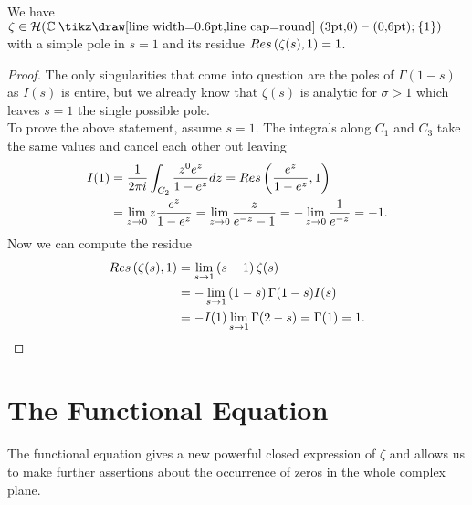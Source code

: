 \begin{theorem}
	We have $\zeta \in \mathcal{H}(\field{C} \mysetminus \fbr{1})$ with a simple pole in $s = 1$ and its residue $Res\left(\zeta(s), 1\right) = 1$.
\end{theorem}
\begin{proof}
	The only singularities that come into question are the poles of $\Gamma(1 - s)$ as $I(s)$ is entire, but we already know that $\zeta(s)$ is analytic for $\sigma > 1$ which leaves $s = 1$ the single possible pole. \\
	To prove the above statement, assume $s = 1$. The integrals along $C_1$ and $C_3$ take the same values and cancel each other out leaving
\begin{equation*}
\begin{aligned}
	I(1) 
	&= \frac{1}{2 \pi i} \int _{C_2} \frac{z^{0} e^z}{1 - e^z} dz = Res\left(\frac{e^z}{1 - e^z}, 1\right) \\
	&= \lim\limits _{z \to 0} z \frac{e^z}{1 - e^z} = \lim\limits _{z \to 0} \frac{z}{e^{-z} - 1} = -\lim\limits _{z \to 0} \frac{1}{e^{-z}} = -1.
\end{aligned}
\end{equation*}
	Now we can compute the residue
\begin{equation*}
\begin{aligned}	
	Res\left(\zeta(s), 1\right) 
	&= \lim\limits _{s \to 1} \left(s - 1\right) \zeta(s) \\
	&= -\lim\limits _{s \to 1} \left(1 - s\right) \Gamma(1 - s) I(s) \\
	&= -I(1) \lim\limits _{s \to 1} \Gamma(2 - s) = \Gamma(1) = 1.
\end{aligned}
\end{equation*}
\end{proof}


\section{The Functional Equation}
The functional equation gives a new powerful closed expression of $\zeta$ and allows us to make further assertions about the occurrence of zeros in the whole complex plane.


